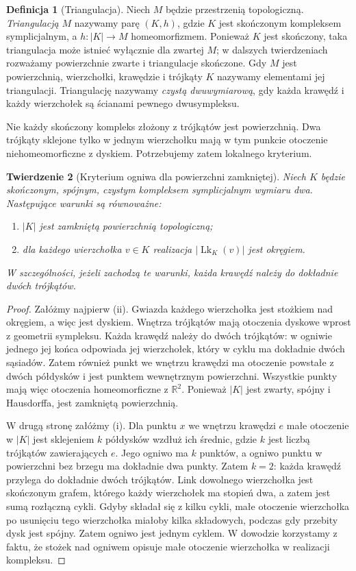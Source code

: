 \documentclass[11pt,a4paper]{report}
\numberwithin{equation}{section}
\theoremstyle{plain}
\newtheorem{twierdzenie}{Twierdzenie}[section]
\theoremstyle{definition}
\newtheorem{definicja}[twierdzenie]{Definicja}
\theoremstyle{remark}
\begin{document}
\begin{definicja}[Triangulacja]
Niech $M$ będzie przestrzenią topologiczną. \emph{Triangulacją}
$M$ nazywamy parę $(K,h)$, gdzie $K$ jest skończonym
kompleksem symplicjalnym, a $h:|K|\to M$ homeomorfizmem.
Ponieważ $K$ jest skończony, taka triangulacja może istnieć
wyłącznie dla zwartej $M$; w dalszych twierdzeniach rozważamy
powierzchnie zwarte i triangulacje skończone. Gdy $M$ jest
powierzchnią, wierzchołki, krawędzie i trójkąty $K$ nazywamy
elementami jej triangulacji. Triangulację
nazywamy \emph{czystą dwuwymiarową}, gdy każda krawędź
i każdy wierzchołek są ścianami pewnego dwusympleksu.
\end{definicja}

Nie każdy skończony kompleks złożony z trójkątów jest
powierzchnią. Dwa trójkąty sklejone tylko w jednym
wierzchołku mają w tym punkcie otoczenie niehomeomorficzne
z dyskiem. Potrzebujemy zatem lokalnego kryterium.

\begin{twierdzenie}[Kryterium ogniwa dla powierzchni zamkniętej]
\label{thm:tg-link-surface}
Niech $K$ będzie skończonym, spójnym, czystym
kompleksem symplicjalnym wymiaru dwa. Następujące warunki
są równoważne:
\begin{enumerate}[label=(\roman*)]
\item $|K|$ jest zamkniętą powierzchnią topologiczną;
\item dla każdego wierzchołka $v\in K$ realizacja
$|\operatorname{Lk}_K(v)|$ jest okręgiem.
\end{enumerate}
W szczególności, jeżeli zachodzą te warunki, każda
krawędź należy do dokładnie dwóch trójkątów.
\end{twierdzenie}

\begin{proof}
Załóżmy najpierw (ii). Gwiazda każdego wierzchołka jest
stożkiem nad okręgiem, a więc jest dyskiem. Wnętrza trójkątów
mają otoczenia dyskowe wprost z geometrii sympleksu.
Każda krawędź należy do dwóch trójkątów: w ogniwie jednego
jej końca odpowiada jej wierzchołek, który w cyklu ma
dokładnie dwóch sąsiadów. Zatem również punkt we wnętrzu
krawędzi ma otoczenie powstałe z dwóch półdysków i jest
punktem wewnętrznym powierzchni. Wszystkie punkty mają
więc otoczenia homeomorficzne z $\mathbb R^2$. Ponieważ
$|K|$ jest zwarty, spójny i Hausdorffa, jest zamkniętą
powierzchnią.

W drugą stronę załóżmy (i). Dla punktu $x$ we wnętrzu
krawędzi $e$ małe otoczenie w $|K|$ jest sklejeniem
$k$ półdysków wzdłuż ich średnic, gdzie $k$ jest liczbą
trójkątów zawierających $e$. Jego ogniwo ma $k$ punktów,
a ogniwo punktu w powierzchni bez brzegu ma dokładnie
dwa punkty. Zatem $k=2$: każda krawędź przylega do
dokładnie dwóch trójkątów. Link dowolnego
wierzchołka jest skończonym grafem, którego każdy
wierzchołek ma stopień dwa, a zatem jest sumą rozłączną
cykli. Gdyby składał się z kilku cykli, małe otoczenie
wierzchołka po usunięciu tego wierzchołka miałoby kilka
składowych, podczas gdy przebity dysk jest spójny.
Zatem ogniwo jest jednym cyklem. W dowodzie korzystamy
z faktu, że stożek nad ogniwem opisuje małe otoczenie
wierzchołka w realizacji kompleksu.
\end{proof}
\end{document}
